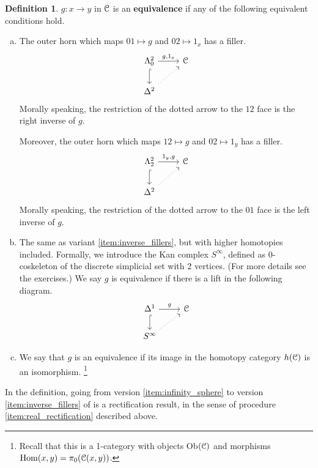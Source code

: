 \documentclass[10pt,a4paper,reqno,oneside]{book} %
\theoremstyle{plain}
\theoremstyle{definition}
\newtheorem{defin}[thm]{Definition}
\theoremstyle{remark}
\numberwithin{equation}{section}
\begin{document}
\begin{defin}
$g : x \to y$ in $\mathcal C$ is an \textbf{equivalence} if any of the following equivalent conditions hold.
\begin{enumerate}[(a)]
\item \label{item:inverse_fillers}
The outer horn which maps $01\mapsto g$ and $02 \mapsto 1_x$ has a filler.
\[
\begin{tikzcd}
\Lambda^2_0 \arrow{r}{g,1_x}\arrow[hook]{d} & \cC \\
\Delta^2 \arrow[dotted]{ur} & 
\end{tikzcd}
\]
Morally speaking, the restriction of the dotted arrow to the $12$ face is the right inverse of $g$.

Moreover, the outer horn which maps $12\mapsto g$ and $02 \mapsto 1_y$ has a filler.
\[
\begin{tikzcd}
\Lambda^2_2 \arrow{r}{1_y,g}\arrow[hook]{d} & \cC \\
\Delta^2 \arrow[dotted]{ur} & 
\end{tikzcd}
\]
Morally speaking, the restriction of the dotted arrow to the $01$ face is the left inverse of $g$.

\item \label{item:infinity_sphere}
The same as variant \ref{item:inverse_fillers}, but with higher homotopies included. Formally, we introduce the
Kan complex $S^{\infty}$, defined as 0-coskeleton of the discrete simplicial set with 2 vertices. (For more details see
the exercises.) 
We say $g$ is equivalence if there is a lift in the following diagram.
\[
\begin{tikzcd}
\Delta^1 \arrow{r}{g}\arrow[hook]{d} & \cC \\
S^{\infty}\arrow[dotted]{ur} & 
\end{tikzcd}
\]

\item \label{item:iso_homcat}
We say that $g$ is an equivalence if its image in the homotopy category $h(\mathcal C)$ is an isomorphism.
\footnote{Recall that this is a 1-category with objects Ob$(\mathcal C)$ and morphisms $\operatorname{Hom}(x,y) = \pi_0(\mathcal C(x,y))$.}
\end{enumerate}
\end{defin}

In the definition, going from version \ref{item:infinity_sphere} to version \ref{item:inverse_fillers} of is a rectification result,
in the sense of procedure \ref{item:real_rectification} described above.
\end{document}
